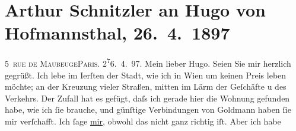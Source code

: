 

         
         \renewcommand{\erwaehntePersonen}{Personen: Maurice Donnay, Paul Goldmann, Gustave Guiches, Abel Hermant, Paul Ernest Hervieu, Hugo von Hofmannsthal, Hugo August von Hofmannsthal, Anna von Hofmannsthal, Ferdinand Raimund, Marie Reinhard}
         \renewcommand{\erwaehnteOrte}{Orte: Paris, Wien, rue de Maubeuge}
         \renewcommand{\erwaehnteWerke}{Werke: Der Alpenkönig und der Menschenfeind, La Carrière, La Douloureuse, Männerrecht, Snob}
               \section[Arthur Schnitzler an Hugo von Hofmannsthal, 26. 4. 1897]{ Arthur Schnitzler an Hugo von Hofmannsthal, 26. 4. 1897}\nopagebreak{}\rehead{ }\begin{ledgroupsized}[t]{13cm}\normalsize\beginnumbering \toendnotes[C]{\smallbreak\pagebreak[2]} 
\toendnotes[C]{\smallbreak}\pstart
           \raggedleft{}{\pb}5 \textsc{rue \introOben{}de\introOben{} Maubeuge}\textsc{Paris}. 2\substVorne{}\textsuperscript{7}\substDazwischen{}6\substHinten{}. 4. 97.\pend
           \pstart
           Mein lieber Hugo. Seien Sie mir herzlich gegrüßt. Ich lebe im I{\geminationn}erſten der Stadt, wie ich in Wien um keinen Preis leben möchte; an der Kreuzung vieler
               Straßen, mitten im Lärm der Geſchäfte u des Verkehrs. Der Zufall hat es gefügt, daſs
               ich gerade hier die Wohnung gefunden habe, wie ich ſie brauche, und günſtige
               Verbindungen von Goldmann haben ſie mir
               verſchafft. Ich ſage \uline{mir}, obwohl das nicht ganz richtig iſt. Aber ich habe

\end{ledgroupsized}
